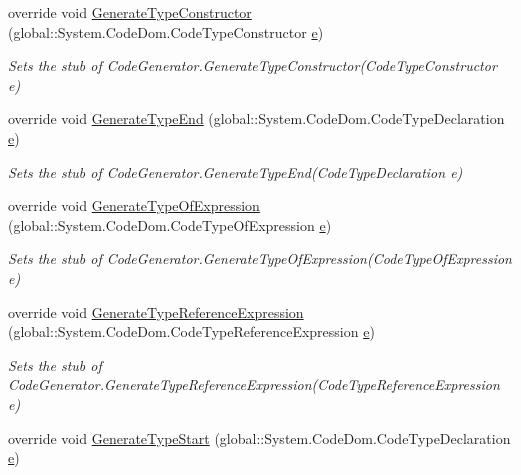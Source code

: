 \begin{DoxyCompactItemize}
override void \hyperlink{class_system_1_1_code_dom_1_1_compiler_1_1_fakes_1_1_stub_code_compiler_a16ee03d615aebecac582306d262ba17e}{Generate\-Type\-Constructor} (global\-::\-System.\-Code\-Dom.\-Code\-Type\-Constructor \hyperlink{jquery-1_810_82_8min_8js_a2c038346d47955cbe2cb91e338edd7e1}{e})
\begin{DoxyCompactList}\small\item\em Sets the stub of Code\-Generator.\-Generate\-Type\-Constructor(\-Code\-Type\-Constructor e)\end{DoxyCompactList}\item 
override void \hyperlink{class_system_1_1_code_dom_1_1_compiler_1_1_fakes_1_1_stub_code_compiler_abad7592dc74a52f796d43fd1f7742310}{Generate\-Type\-End} (global\-::\-System.\-Code\-Dom.\-Code\-Type\-Declaration \hyperlink{jquery-1_810_82_8min_8js_a2c038346d47955cbe2cb91e338edd7e1}{e})
\begin{DoxyCompactList}\small\item\em Sets the stub of Code\-Generator.\-Generate\-Type\-End(\-Code\-Type\-Declaration e)\end{DoxyCompactList}\item 
override void \hyperlink{class_system_1_1_code_dom_1_1_compiler_1_1_fakes_1_1_stub_code_compiler_ad4885128d2a3721b901f7df473952415}{Generate\-Type\-Of\-Expression} (global\-::\-System.\-Code\-Dom.\-Code\-Type\-Of\-Expression \hyperlink{jquery-1_810_82_8min_8js_a2c038346d47955cbe2cb91e338edd7e1}{e})
\begin{DoxyCompactList}\small\item\em Sets the stub of Code\-Generator.\-Generate\-Type\-Of\-Expression(\-Code\-Type\-Of\-Expression e)\end{DoxyCompactList}\item 
override void \hyperlink{class_system_1_1_code_dom_1_1_compiler_1_1_fakes_1_1_stub_code_compiler_a5d3d60321be931c1dc16924c7d74d586}{Generate\-Type\-Reference\-Expression} (global\-::\-System.\-Code\-Dom.\-Code\-Type\-Reference\-Expression \hyperlink{jquery-1_810_82_8min_8js_a2c038346d47955cbe2cb91e338edd7e1}{e})
\begin{DoxyCompactList}\small\item\em Sets the stub of Code\-Generator.\-Generate\-Type\-Reference\-Expression(\-Code\-Type\-Reference\-Expression e)\end{DoxyCompactList}\item 
override void \hyperlink{class_system_1_1_code_dom_1_1_compiler_1_1_fakes_1_1_stub_code_compiler_aa2427ab25a22b08f72b47abec5853af6}{Generate\-Type\-Start} (global\-::\-System.\-Code\-Dom.\-Code\-Type\-Declaration \hyperlink{jquery-1_810_82_8min_8js_a2c038346d47955cbe2cb91e338edd7e1}{e})

\end{DoxyCompactItemize}
